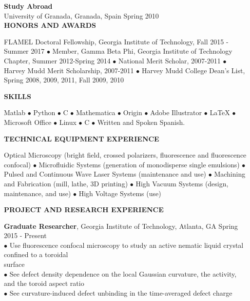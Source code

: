 \documentclass[10pt]{article}
\newenvironment{changemargin}[2]{%
  \list{}{\rightmargin#2\leftmargin#1
    \parsep=0pt\topsep=1pt\partopsep=0pt}
\item[]} {\endlist}
\newenvironment{indentmore}{\begin{changemargin}{10pt}{0cm}}{\end{changemargin}}
\begin{document}
\vspace{5pt}
\textbf{Study Abroad} \\
\hspace*{10pt}University of Granada, Granada, Spain \hfill Spring 2010\\


\textbf{\large HONORS AND AWARDS}
\begin{indentmore}
FLAMEL Doctoral Fellowship, Georgia Institute of Technology, Fall 2015 - Summer 2017 $\bullet$  Member, Gamma Beta Phi, Georgia Institute of Technology Chapter, Summer 2012-Spring 2014 $\bullet$ National Merit Scholar, 2007-2011 $\bullet$ Harvey Mudd Merit Scholarship, 2007-2011 $\bullet$ Harvey Mudd College Dean's List, Spring 2008, 2009, 2011, Fall 2009, 2010
\end{indentmore}

\vspace{10pt}
\textbf{\large SKILLS}
\begin{indentmore}
Matlab  $\bullet$ Python $\bullet$ C $\bullet$ Mathematica $\bullet$
Origin
$\bullet$ Adobe Illustrator $\bullet$ LaTeX $\bullet$ Microsoft Office $\bullet$ Linux $\bullet$ C $\bullet$  Written and Spoken Spanish.
\end{indentmore}
\vspace{10pt}

\textbf{\large TECHNICAL EQUIPMENT EXPERIENCE}
\begin{indentmore}
Optical Microscopy (bright field, crossed polarizers, fluorescence and fluorescence confocal)
$\bullet$ Microfluidic Systems (generation of monodisperse single emulsions)
$\bullet$ Pulsed and Continuous Wave Laser Systems (maintenance and use)
$\bullet$ Machining and Fabrication (mill, lathe, 3D printing)
$\bullet$ High Vacuum Systems (design, maintenance, and use)
$\bullet$ High Voltage Systems (use)
\end{indentmore}
\vspace{10pt}

\textbf{\large PROJECT AND RESEARCH EXPERIENCE}

{\bf Graduate Researcher}, Georgia Institute of Technology, Atlanta, GA \hfill Spring 2015 - Present\\
\hspace*{10pt}$\bullet$ Use fluorescence confocal microscopy to study an active nematic liquid crystal confined to a toroidal\\ \hspace*{15pt} surface\\
\hspace*{10pt}$\bullet$ See defect density dependence on the local Gaussian curvature, the activity, and the toroid aspect ratio\\
\hspace*{10pt}$\bullet$ See curvature-induced defect unbinding in the time-averaged defect charge\\
\end{document}
